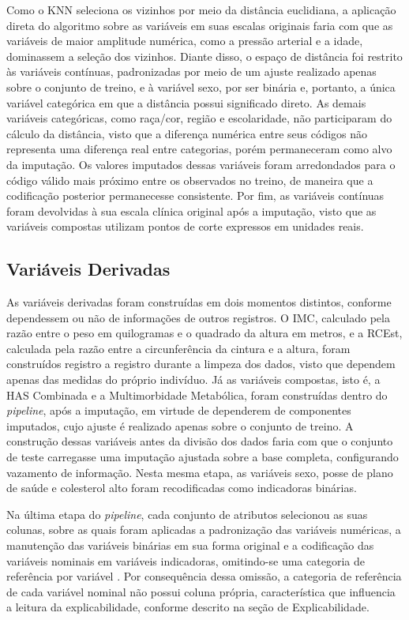 Como o KNN seleciona os vizinhos por meio da distância euclidiana, a aplicação direta do algoritmo sobre as variáveis em suas escalas originais faria com que as variáveis de maior amplitude numérica, como a pressão arterial e a idade, dominassem a seleção dos vizinhos. Diante disso, o espaço de distância foi restrito às variáveis contínuas, padronizadas por meio de um ajuste realizado apenas sobre o conjunto de treino, e à variável sexo, por ser binária e, portanto, a única variável categórica em que a distância possui significado direto. As demais variáveis categóricas, como raça/cor, região e escolaridade, não participaram do cálculo da distância, visto que a diferença numérica entre seus códigos não representa uma diferença real entre categorias, porém permaneceram como alvo da imputação. Os valores imputados dessas variáveis foram arredondados para o código válido mais próximo entre os observados no treino, de maneira que a codificação posterior permanecesse consistente. Por fim, as variáveis contínuas foram devolvidas à sua escala clínica original após a imputação, visto que as variáveis compostas utilizam pontos de corte expressos em unidades reais.

\subsection{Variáveis Derivadas}\label{sec:derivadas}
As variáveis derivadas foram construídas em dois momentos distintos, conforme dependessem ou não de informações de outros registros. O IMC, calculado pela razão entre o peso em quilogramas e o quadrado da altura em metros, e a RCEst, calculada pela razão entre a circunferência da cintura e a altura, foram construídos registro a registro durante a limpeza dos dados, visto que dependem apenas das medidas do próprio indivíduo. Já as variáveis compostas, isto é, a HAS Combinada e a Multimorbidade Metabólica, foram construídas dentro do \textit{pipeline}, após a imputação, em virtude de dependerem de componentes imputados, cujo ajuste é realizado apenas sobre o conjunto de treino. A construção dessas variáveis antes da divisão dos dados faria com que o conjunto de teste carregasse uma imputação ajustada sobre a base completa, configurando vazamento de informação. Nesta mesma etapa, as variáveis sexo, posse de plano de saúde e colesterol alto foram recodificadas como indicadoras binárias.

Na última etapa do \textit{pipeline}, cada conjunto de atributos selecionou as suas colunas, sobre as quais foram aplicadas a padronização das variáveis numéricas, a manutenção das variáveis binárias em sua forma original e a codificação das variáveis nominais em variáveis indicadoras, omitindo-se uma categoria de referência por variável \cite{pedregosa2011scikit}. Por consequência dessa omissão, a categoria de referência de cada variável nominal não possui coluna própria, característica que influencia a leitura da explicabilidade, conforme descrito na seção de Explicabilidade.

